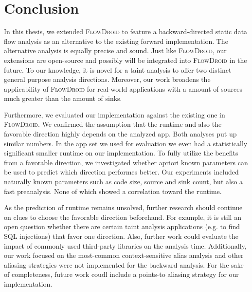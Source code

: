 \documentclass[../draft.tex]{subfiles}
\begin{document}
    \chapter{Conclusion}
    In this thesis, we extended \textsc{FlowDroid} to feature a backward-directed static data flow analysis as an alternative to the existing forward implementation.
    The alternative analysis is equally precise and sound.
    Just like \textsc{FlowDroid}, our extensions are open-source and possibly will be integrated into \textsc{FlowDroid} in the future.
    To our knowledge, it is novel for a taint analysis to offer two distinct general purpose analysis directions.
    Moreover, our work broadens the applicability of \textsc{FlowDroid} for real-world applications with a amount of sources much greater than the amount of sinks.

    Furthermore, we evaluated our implementation against the existing one in \textsc{FlowDroid}.
    We confirmed the assumption that the runtime and also the favorable direction highly depends on the analyzed app.
    Both analyses put up similar numbers.
    In the app set we used for evaluation we even had a statistically significant smaller runtime on our implementation.
    To fully utilize the benefits from a favorable direction, we investigated whether apriori known parameters can be used to predict which direction performes better.
    Our experiments included naturally known parameters such as code size, source and sink count, but also a fast preanalysis.
    None of which showed a correlation toward the runtime.

    As the prediction of runtime remains unsolved, further research should continue on clues to choose the favorable direction beforehand.
    For example, it is still an open question whether there are certain taint analysis applications (e.g. to find SQL injections) that favor one direction.
    Also, further work could evaluate the impact of commonly used third-party libraries on the analysis time.
    Additionally, our work focused on the most-common context-sensitive alias analysis and other aliasing strategies were not implemented for the backward analysis. 
    For the sake of completeness, future work coudl include a points-to aliasing strategy for our implementation.
\end{document}
